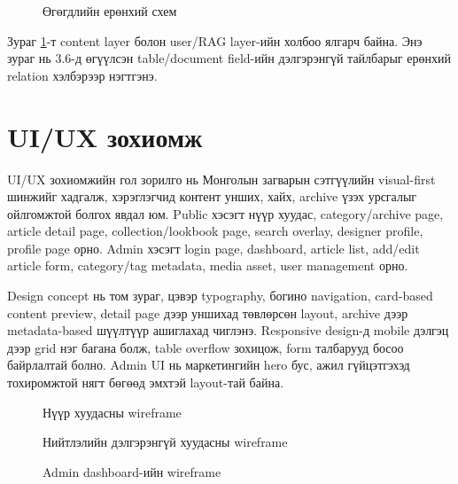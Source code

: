\begin{figure}[htbp]
  \centering
  \resizebox{\textwidth}{!}{}
  \caption[Өгөгдлийн ерөнхий схем]{Өгөгдлийн ерөнхий схем}
  \label{fig:ch3-data-schema}
\end{figure}

Зураг \ref{fig:ch3-data-schema}-т content layer болон user/RAG layer-ийн холбоо ялгарч байна. Энэ зураг нь 3.6-д өгүүлсэн table/document field-ийн дэлгэрэнгүй тайлбарыг ерөнхий relation хэлбэрээр нэгтгэнэ.

\section{UI/UX зохиомж}
UI/UX зохиомжийн гол зорилго нь Монголын загварын сэтгүүлийн visual-first шинжийг хадгалж, хэрэглэгчид контент унших, хайх, archive үзэх урсгалыг ойлгомжтой болгох явдал юм. Public хэсэгт нүүр хуудас, category/archive page, article detail page, collection/lookbook page, search overlay, designer profile, profile page орно. Admin хэсэгт login page, dashboard, article list, add/edit article form, category/tag metadata, media asset, user management орно.

Design concept нь том зураг, цэвэр typography, богино navigation, card-based content preview, detail page дээр уншихад төвлөрсөн layout, archive дээр metadata-based шүүлтүүр ашиглахад чиглэнэ. Responsive design-д mobile дэлгэц дээр grid нэг багана болж, table overflow зохицож, form талбарууд босоо байрлалтай болно. Admin UI нь маркетингийн hero бус, ажил гүйцэтгэхэд тохиромжтой нягт бөгөөд эмхтэй layout-тай байна.

\begin{figure}[htbp]
  \centering
  \resizebox{0.86\textwidth}{!}{}
  \caption[Нүүр хуудасны wireframe]{Нүүр хуудасны wireframe}
  \label{fig:ch3-wireframe-home}
\end{figure}

\begin{figure}[htbp]
  \centering
  \resizebox{0.86\textwidth}{!}{}
  \caption[Нийтлэлийн дэлгэрэнгүй хуудасны wireframe]{Нийтлэлийн дэлгэрэнгүй хуудасны wireframe}
  \label{fig:ch3-wireframe-article}
\end{figure}

\begin{figure}[htbp]
  \centering
  \resizebox{0.86\textwidth}{!}{}
  \caption[Admin dashboard-ийн wireframe]{Admin dashboard-ийн wireframe}
  \label{fig:ch3-wireframe-admin}
\end{figure}

